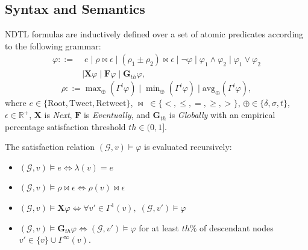 \documentclass[10pt,twocolumn]{article}
\begin{document}
\subsection{Syntax and Semantics}
NDTL formulas are inductively defined over a set of atomic predicates according to the following grammar:
\begin{align}
\varphi ::= & \; e \mid \rho \bowtie \epsilon \mid (\rho_1 \pm \rho_2) \bowtie \epsilon \mid \neg \varphi \mid \varphi_1 \land \varphi_2 \mid \varphi_1 \lor \varphi_2 \nonumber \\
& \mid \mathbf{X}\varphi \mid \mathbf{F}\varphi \mid \mathbf{G}_{th}\varphi,
\end{align}
\begin{equation}
\rho ::= \max\nolimits_\oplus(\Gamma^i \varphi) \mid \min\nolimits_\oplus(\Gamma^i \varphi) \mid \text{avg}_\oplus(\Gamma^i \varphi),
\end{equation}
where $e \in \{\text{Root}, \text{Tweet}, \text{Retweet}\}$, $\bowtie \; \in \{<, \le, =, \ge, >\}$, $\oplus \in \{\delta, \sigma, t\}$, $\epsilon \in \mathbb{R}^+$, $\mathbf{X}$ is \textit{Next}, $\mathbf{F}$ is \textit{Eventually}, and $\mathbf{G}_{th}$ is \textit{Globally} with an empirical percentage satisfaction threshold $th \in (0, 1]$.

The satisfaction relation $(\mathcal{G}, v) \models \varphi$ is evaluated recursively:
\begin{itemize}
    \item $(\mathcal{G}, v) \models e \iff \lambda(v) = e$
    \item $(\mathcal{G}, v) \models \rho \bowtie \epsilon \iff \rho(v) \bowtie \epsilon$
    \item $(\mathcal{G}, v) \models \mathbf{X}\varphi \iff \forall v' \in \Gamma^1(v), \; (\mathcal{G}, v') \models \varphi$
    \item $(\mathcal{G}, v) \models \mathbf{G}_{th}\varphi \iff (\mathcal{G}, v') \models \varphi$ for at least $th\%$ of descendant nodes $v' \in \{v\} \cup \Gamma^\infty(v)$.
\end{itemize}
\end{document}
